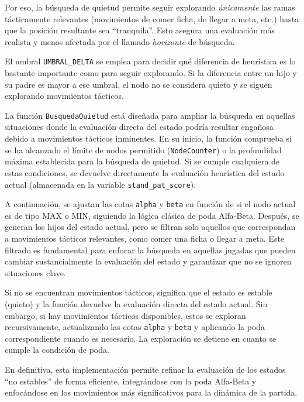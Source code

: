 Por eso, la búsqueda de quietud permite seguir explorando \emph{únicamente} las ramas tácticamente relevantes (movimientos de comer ficha, de llegar a meta, etc.) hasta que la posición resultante sea ``tranquila''. Esto asegura una evaluación más realista y menos afectada por el llamado \emph{horizonte} de búsqueda.

El umbral \texttt{UMBRAL\_DELTA} se emplea para decidir qué diferencia de heurística es lo bastante importante como para seguir explorando. Si la diferencia entre un hijo y su padre es mayor a ese umbral, el nodo no se considera quieto y se siguen explorando movimientos tácticos.

La función \texttt{BusquedaQuietud} está diseñada para ampliar la búsqueda en aquellas situaciones donde la evaluación directa del estado podría resultar engañosa debido a movimientos tácticos inminentes. En su inicio, la función comprueba si se ha alcanzado el límite de nodos permitido (\texttt{NodeCounter}) o la profundidad máxima establecida para la búsqueda de quietud. Si se cumple cualquiera de estas condiciones, se devuelve directamente la evaluación heurística del estado actual (almacenada en la variable \texttt{stand\_pat\_score}).

A continuación, se ajustan las cotas \texttt{alpha} y \texttt{beta} en función de si el nodo actual es de tipo MAX o MIN, siguiendo la lógica clásica de poda Alfa-Beta. Después, se generan los hijos del estado actual, pero se filtran solo aquellos que correspondan a movimientos tácticos relevantes, como comer una ficha o llegar a meta. Este filtrado es fundamental para enfocar la búsqueda en aquellas jugadas que pueden cambiar sustancialmente la evaluación del estado y garantizar que no se ignoren situaciones clave.

Si no se encuentran movimientos tácticos, significa que el estado es estable (quieto) y la función devuelve la evaluación directa del estado actual. Sin embargo, si hay movimientos tácticos disponibles, estos se exploran recursivamente, actualizando las cotas \texttt{alpha} y \texttt{beta} y aplicando la poda correspondiente cuando es necesario. La exploración se detiene en cuanto se cumple la condición de poda.

En definitiva, esta implementación permite refinar la evaluación de los estados ``no estables'' de forma eficiente, integrándose con la poda Alfa-Beta y enfocándose en los movimientos más significativos para la dinámica de la partida.



